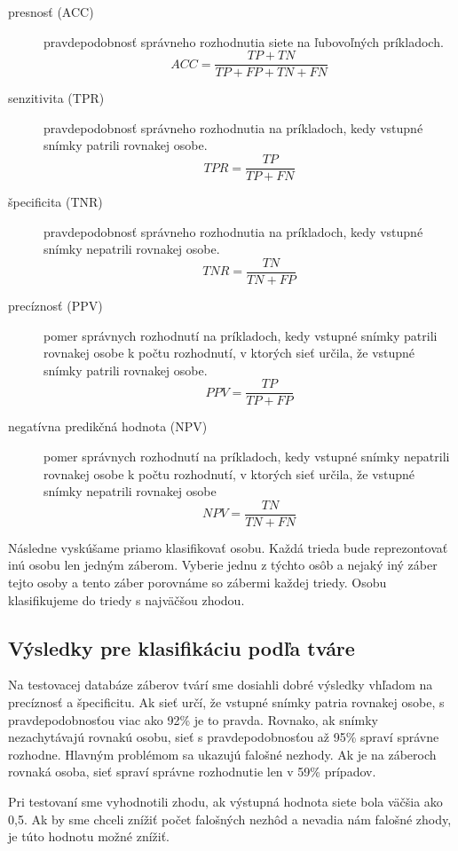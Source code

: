 \begin{description}
\item[presnosť (ACC)] pravdepodobnosť správneho rozhodnutia siete na ľubovoľných príkladoch.
$$ACC = \frac{TP + TN}{TP + FP + TN + FN}$$
\item[senzitivita (TPR)] pravdepodobnosť správneho rozhodnutia na príkladoch, kedy vstupné snímky patrili rovnakej osobe.
$$TPR = \frac{TP}{TP + FN}$$
\item[špecificita (TNR)] pravdepodobnosť správneho rozhodnutia na príkladoch, kedy vstupné snímky nepatrili rovnakej osobe.
$$TNR = \frac{TN}{TN + FP}$$
\item[precíznosť (PPV)] pomer správnych rozhodnutí na príkladoch, kedy vstupné snímky patrili rovnakej osobe k počtu rozhodnutí, v ktorých sieť určila, že vstupné snímky patrili rovnakej osobe.
$$PPV = \frac{TP}{TP + FP}$$
\item[negatívna predikčná hodnota (NPV)] pomer správnych rozhodnutí na príkladoch, kedy vstupné snímky nepatrili rovnakej osobe k počtu rozhodnutí, v ktorých sieť určila, že vstupné snímky nepatrili rovnakej osobe
$$NPV = \frac{TN}{TN + FN}$$
\end{description}

Následne vyskúšame priamo klasifikovať osobu.
Každá trieda bude reprezontovať inú osobu len jedným záberom.
Vyberie jednu z týchto osôb a nejaký iný záber tejto osoby a tento záber porovnáme so zábermi každej triedy.
Osobu klasifikujeme do triedy s najväčšou zhodou.

\subsection{Výsledky pre klasifikáciu podľa tváre}

Na testovacej databáze záberov tvárí sme dosiahli dobré výsledky vhľadom na precíznosť a špecificitu.
Ak sieť určí, že vstupné snímky patria rovnakej osobe, s pravdepodobnosťou viac ako 92\% je to pravda.
Rovnako, ak snímky nezachytávajú rovnakú osobu, sieť s pravdepodobnosťou až 95\% spraví správne rozhodne.
Hlavným problémom sa ukazujú falošné nezhody.
Ak je na záberoch rovnaká osoba, sieť spraví správne rozhodnutie len v 59\% prípadov.

Pri testovaní sme vyhodnotili zhodu, ak výstupná hodnota siete bola väčšia ako 0,5. 
Ak by sme chceli znížiť počet falošných nezhôd a nevadia nám falošné zhody, je túto hodnotu možné znížiť.


